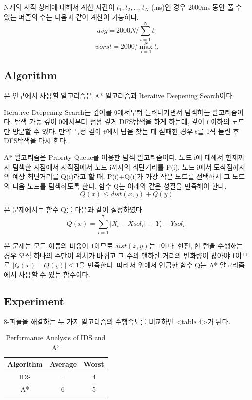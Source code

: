 \documentclass{sig-alternate-05-2015}
\begin{document}
\begin{CJK}{UTF8}{mj}
N개의 시작 상태에 대해서 계산 시간이 $t_1, t_2, ..., t_N$ (ms)인 경우 2000ms 동안 풀 수 있는 퍼즐의 수는 다음과 같이 계산이 가능하다.
\begin{equation} avg = 2000N / \sum_{i=1}^{N}t_i \end{equation}
\begin{equation} worst = 2000 / \max_{i=1}^{N}t_i \end{equation}
\subsection{Algorithm}
본 연구에서 사용할 알고리즘은 A* 알고리즘과 Iterative Deepening Search이다.

Iterative Deepening Search는 깊이를 0에서부터 늘려나가면서 탐색하는 알고리즘이다. 탐색 가능 깊이 0에서부터 점점 깊게 DFS탐색을 하게 하는데, 깊이 i 이하의 노드만 방문할 수 있다. 만약 특정 깊이 t에서 답을 찾는 데 실패한 경우 t를 1씩 늘린 후 DFS탐색을 다시 한다.

A* 알고리즘은 Priority Queue를 이용한 탐색 알고리즘이다. 노드 i에 대해서 현재까지 탐색한 시점에서 시작점에서 노드 i까지의 최단거리를 P(i), 노드 i에서 도착점까지의 예상 최단거리를 Q(i)라고 할 때, P(i)+Q(i)가 가장 작은 노드를 선택해서 그 노드의 다음 노드를 탐색하도록 한다. 함수 Q는 아래와 같은 성질을 만족해야 한다.
\begin{equation} Q(x) \leq dist(x,y) + Q(y) \end{equation}

본 문제에서는 함수 Q를 다음과 같이 설정하였다.
\begin{equation} Q(x) = \sum_{i=1}^{7}{|X_i-Xsol_i| + |Y_i-Ysol_i|} \end{equation}

본 문제는 모든 이동의 비용이 1이므로 $dist(x,y)$는 1이다. 한편, 한 턴을 수행하는 경우 오직 하나의 수만이 위치가 바뀌고 그 수의 맨하탄 거리의 변화량이 많아야 1이므로 $|Q(x)-Q(y)| \le 1$을 만족한다. 따라서 위에서 언급한 함수 Q는 A* 알고리즘에서 사용할 수 있는 함수이다.

\subsection{Experiment}
8-퍼즐을 해결하는 두 가지 알고리즘의 수행속도를 비교하면 <table 4>가 된다.
\begin{table}
\centering
\caption{Performance Analysis of IDS and A*}
\begin{tabular}{|c|c|c|} \hline
Algorithm & Average & Worst \\ \hline
IDS & - & 4 \\ \hline
A* & 6 & 5 \\ 
\hline\end{tabular}
\end{table}


\end{CJK}
\end{document}
